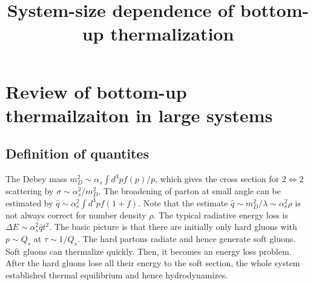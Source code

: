 \documentclass[onecolumn,showpacs,nobibnotes,nofootinbib,12pt]{revtex4-1}
\begin{document}
\title{System-size dependence of bottom-up thermalization}
\maketitle
\section{Review of bottom-up thermailzaiton in large systems}
\subsection{Definition of quantites}
The Debey mass $m_D^2 \sim \alpha_s \int d^3 p f(p)/p$, which gives the cross section for $2\Leftrightarrow2$ scattering by $\sigma\sim \alpha_s^2/m_D^2$. The broadening of parton at small angle can be estimated by $\hat{q}\sim\alpha_s^2\int d^3p f(1+f)$. Note that the estimate $\hat{q}\sim m_D^2/\lambda \sim \alpha_s^2\rho$ is not always correct for number density $\rho$. The typical radiative energy loss is $\Delta E\sim \alpha_s^2 \hat{q}t^2$. The basic picture is that there are initially only hard gluons with $p\sim Q_s$ at $\tau\sim 1/Q_s$. The hard partons radiate and hence generate soft gluons. Soft gluons can thermalize quickly. Then, it becomes an energy loss problem. After the hard gluons lose all their energy to the soft section, the whole system established thermal equilibrium and hence hydrodynamizes.
\end{document}
